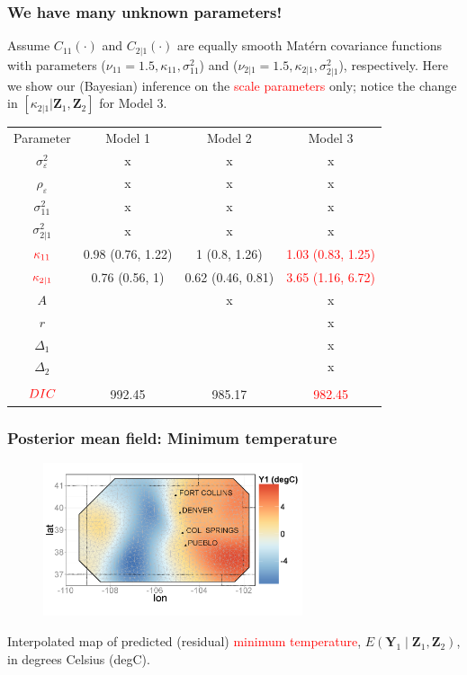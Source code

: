 \documentclass{beamer}
\newcommand{\Yvec}{\mathbf{Y}}
\newcommand{\Zvec}{\mathbf{Z}}
\newcommand{\E}{E}
\begin{document}

\begin{frame}
\frametitle{We have many unknown parameters!}
\vspace{-.5cm}
Assume $C_{11}(\cdot)$ and $C_{2|1}(\cdot)$ are equally smooth Mat{\'e}rn covariance functions with parameters ($\nu_{11}=1.5, \kappa_{11}, \sigma_{11}^2$) and ($\nu_{2|1}=1.5,\kappa_{2|1},\sigma_{2|1}^2$), respectively. Here we show our (Bayesian) inference on the \textcolor{red}{scale parameters} only; notice the change in $[\kappa_{2|1}|\mathbf{Z}_1,\mathbf{Z}_2]$ for Model 3.
\small
\begin{center}
\begin{tabular} {cccc}
  { Parameter} 	& {Model 1} 	& {Model 2} & {Model 3} 			 \\
  $\sigma_\varepsilon^2$&  x & x & x \\
  $\rho_\varepsilon$&  x & x & x \\
  $\sigma^2_{11}$& x & x & x \\
  $\sigma^2_{2|1}$& x & x & x \\
  $\textcolor{red}{\kappa_{11}}$&0.98 (0.76, 1.22)&1 (0.8, 1.26)&\textcolor{red}{1.03 (0.83, 1.25)}\\
  $\textcolor{red}{\kappa_{2|1}}$&0.76 (0.56, 1)&0.62 (0.46, 0.81)&\textcolor{red}{3.65 (1.16, 6.72)}\\
  $A$&& x & x \\
  $r$&&& x \\
  $\Delta_1$&&& x\\
  $\Delta_2$&&& x \\
  &&&\\
  $\textcolor{red}{DIC}$&992.45&985.17&\textcolor{red}{982.45}
\end{tabular}
\end{center}
\normalsize
\end{frame}


\begin{frame}
\frametitle{Posterior mean field: Minimum temperature}

\begin{figure}
\includegraphics[width=3in]{Fig3a1.png}
\end{figure}
\vspace{-.5cm}
Interpolated map of predicted (residual) \textcolor{red}{minimum temperature}, $\E(\Yvec_1 \mid  \Zvec_1,\Zvec_2)$, in degrees Celsius (degC).
\end{frame}
\end{document}
